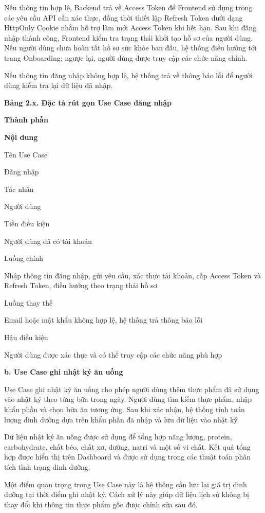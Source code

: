 Nếu thông tin hợp lệ, Backend trả về Access Token để Frontend sử dụng trong các yêu cầu API cần xác thực, đồng thời thiết lập Refresh Token dưới dạng HttpOnly Cookie nhằm hỗ trợ làm mới Access Token khi hết hạn. Sau khi đăng nhập thành công, Frontend kiểm tra trạng thái khởi tạo hồ sơ của người dùng. Nếu người dùng chưa hoàn tất hồ sơ sức khỏe ban đầu, hệ thống điều hướng tới trang Onboarding; ngược lại, người dùng được truy cập các chức năng chính.

Nếu thông tin đăng nhập không hợp lệ, hệ thống trả về thông báo lỗi để người dùng kiểm tra lại dữ liệu đã nhập.

\textbf{Bảng 2.x. Đặc tả rút gọn Use Case đăng nhập}

\textbf{Thành phần}

\textbf{Nội dung}

Tên Use Case

Đăng nhập

Tác nhân

Người dùng

Tiền điều kiện

Người dùng đã có tài khoản

Luồng chính

Nhập thông tin đăng nhập, gửi yêu cầu, xác thực tài khoản, cấp Access Token và Refresh Token, điều hướng theo trạng thái hồ sơ

Luồng thay thế

Email hoặc mật khẩu không hợp lệ, hệ thống trả thông báo lỗi

Hậu điều kiện

Người dùng được xác thực và có thể truy cập các chức năng phù hợp

\textbf{b. Use Case ghi nhật ký ăn uống}

Use Case ghi nhật ký ăn uống cho phép người dùng thêm thực phẩm đã sử dụng vào nhật ký theo từng bữa trong ngày. Người dùng tìm kiếm thực phẩm, nhập khẩu phần và chọn bữa ăn tương ứng. Sau khi xác nhận, hệ thống tính toán lượng dinh dưỡng dựa trên khẩu phần đã nhập và lưu dữ liệu vào nhật ký.

Dữ liệu nhật ký ăn uống được sử dụng để tổng hợp năng lượng, protein, carbohydrate, chất béo, chất xơ, đường, natri và một số vi chất. Kết quả tổng hợp được hiển thị trên Dashboard và được sử dụng trong các thuật toán phân tích tình trạng dinh dưỡng.

Một điểm quan trọng trong Use Case này là hệ thống cần lưu lại giá trị dinh dưỡng tại thời điểm ghi nhật ký. Cách xử lý này giúp dữ liệu lịch sử không bị thay đổi khi thông tin thực phẩm gốc được chỉnh sửa sau đó.


